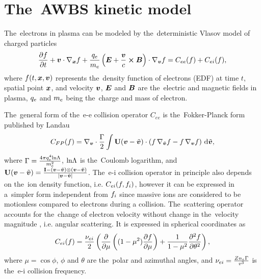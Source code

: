 \section{The~AWBS kinetic model}
\label{sec:AWBSmodel}

The~electrons in plasma can be modeled by the~deterministic Vlasov model 
of charged particles
\begin{equation}
  \frac{\partial{f}}{\partial{t}} + \boldsymbol{v}\cdot\nabla_{\boldsymbol{x}} f + 
  \frac{q_e}{m_e}\left(\boldsymbol{E} + \frac{\boldsymbol{v}}{c}\boldsymbol{\times}\boldsymbol{B}\right)\cdot\nabla_{\boldsymbol{v}} f = 
  C_{ee}(f) + C_{ei}(f) ,
  \label{eq:kinetic_equation}
\end{equation}
where $f(t, \boldsymbol{x}, \boldsymbol{v})$ represents 
the~density function of electrons (EDF)
at time $t$, spatial point $\boldsymbol{x}$, and velocity $\boldsymbol{v}$, $\boldsymbol{E}$ and $\boldsymbol{B}$ are 
the~electric and magnetic fields in plasma, $q_e$ and $m_e$ being 
the~charge and mass of electron.

The~general form of the~e-e collision operator 
$C_{ee}$ is the~Fokker-Planck form published by Landau \cite{Landau_1936}
\begin{equation}
  C_{FP}(f) =
  \nabla_{\boldsymbol{v}}\cdot\frac{\Gamma}{2}\int \mathbf{U}(\boldsymbol{v} - \tilde{\boldsymbol{v}}) \cdot \left(
  f\, \nabla_{\tilde{\boldsymbol{v}}} f - f\, \nabla_{\boldsymbol{v}} f \right)\, \text{d}\tilde{\boldsymbol{v}} ,
  \label{eq:LFP_model}
\end{equation}
where $\Gamma = \frac{4\pi q_e^4\text{ln}\Lambda}{m_e^2}$, $\text{ln}\Lambda$ is the~Coulomb logarithm,
and $\mathbf{U}(\boldsymbol{v} - \tilde{\boldsymbol{v}}) = \frac{\mathbf{I} - (\boldsymbol{v} - \tilde{\boldsymbol{v}})\otimes (\boldsymbol{v} - \tilde{\boldsymbol{v}})}{|\boldsymbol{v} - \tilde{\boldsymbol{v}}|}$.
The~e-i collision operator in principle also depends 
on the~ion density function, i.e. $C_{ei}(f, f_i)$, however it 
can be expressed in a~simpler form independent from $f_i$
since massive ions are considered 
to be motionless compared to electrons during a collision. 
The~scattering operator accounts
for the~change of electron velocity without change in the~velocity magnitude
, i.e. angular scattering. 
It is expressed in spherical coordinates as
\begin{equation}
  C_{ei}(f) = \frac{\nu_{ei}}{2}
  \left(\frac{\partial{}}{\partial{\mu}}\left((1 - \mu^2)\frac{\partial{f}}{\partial{\mu}}\right)
  + \frac{1}{1 - \mu^2}\frac{\partial^2 f}{\partial\theta^2} \right) ,
  \label{eq:ei_scattering}
\end{equation}
where $\mu = \cos\phi$, $\phi$ and $\theta$ are the~polar and azimuthal 
angles, and $\nu_{ei} = \frac{Z n_e \Gamma}{v^3}$ is the~e-i
collision frequency.

